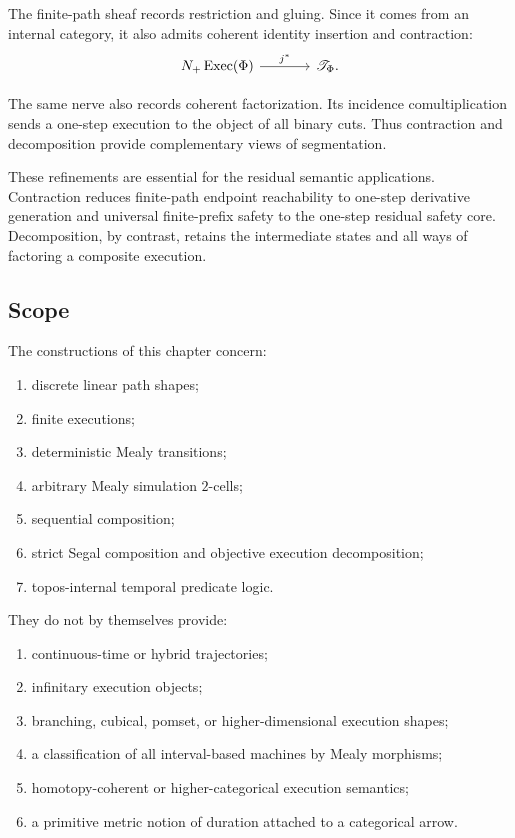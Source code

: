 The finite-path sheaf records restriction and gluing. Since it comes from an
internal category, it also admits coherent identity insertion and
contraction:
\[
\begin{tikzcd}[column sep=large]
    N_+\operatorname{Exec}(\Phi)
        \arrow[r, "{j^\ast}"]
    &
    \mathscr T_\Phi.
\end{tikzcd}
\]

The same nerve also records coherent factorization. Its incidence
comultiplication sends a one-step execution to the object of all binary cuts.
Thus contraction and decomposition provide complementary views of
segmentation.

These refinements are essential for the residual semantic applications.
Contraction reduces finite-path endpoint reachability to one-step derivative
generation and universal finite-prefix safety to the one-step residual safety
core. Decomposition, by contrast, retains the intermediate states and all
ways of factoring a composite execution.

\subsection{Scope}
\label{subsec:temporal-scope}

The constructions of this chapter concern:
\begin{enumerate}
    \item discrete linear path shapes;
    \item finite executions;
    \item deterministic Mealy transitions;
    \item arbitrary Mealy simulation \(2\)-cells;
    \item sequential composition;
    \item strict Segal composition and objective execution decomposition;
    \item topos-internal temporal predicate logic.
\end{enumerate}
They do not by themselves provide:
\begin{enumerate}
    \item continuous-time or hybrid trajectories;
    \item infinitary execution objects;
    \item branching, cubical, pomset, or higher-dimensional execution shapes;
    \item a classification of all interval-based machines by Mealy
    morphisms;
    \item homotopy-coherent or higher-categorical execution semantics;
    \item a primitive metric notion of duration attached to a categorical
    arrow.
\end{enumerate}


